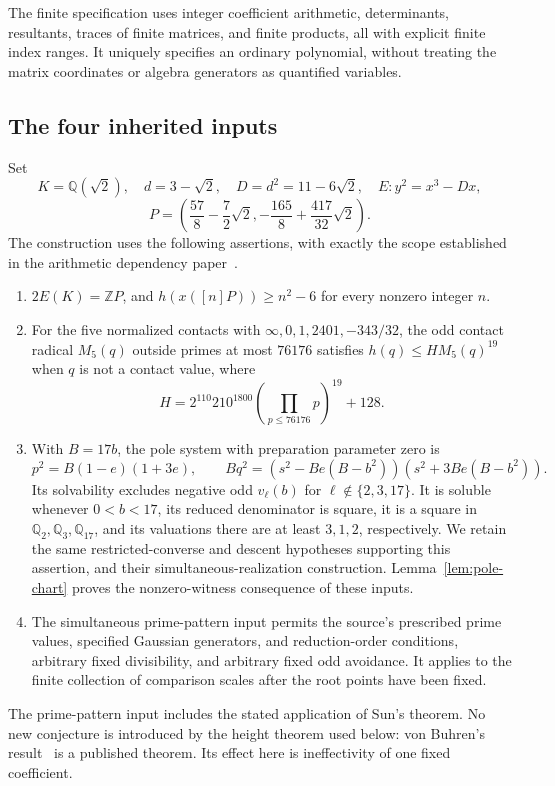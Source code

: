 \documentclass[11pt,a4paper]{article}
\newcommand{\Q}{\mathbb Q}\newcommand{\Z}{\mathbb Z}
\begin{document}
The finite specification uses integer coefficient arithmetic,
determinants, resultants, traces of finite matrices, and finite
products, all with explicit finite index ranges. It uniquely
specifies an ordinary polynomial, without treating the matrix
coordinates or algebra generators as quantified variables.

\subsection{The four inherited inputs}\label{sec:inputs}

Set
\[
 K=\Q(\sqrt2),\quad d=3-\sqrt2,\quad D=d^2=11-6\sqrt2,
 \quad E:y^2=x^3-Dx,
\]
\[
 P=\left(\frac{57}{8}-\frac72\sqrt2,
          -\frac{165}{8}+\frac{417}{32}\sqrt2\right).
\]
The construction uses the following assertions, with exactly the
scope established in the arithmetic dependency paper~\cite{Dependencies}.
\begin{enumerate}
\item $2E(K)=\Z P$, and $h(x([n]P))\ge n^2-6$ for every
      nonzero integer $n$.
\item For the five normalized contacts with
      $\infty,0,1,2401,-343/32$, the odd contact radical
      $M_5(q)$ outside primes at most $76176$ satisfies
      $h(q)\le H M_5(q)^{19}$ when $q$ is not a contact value,
      where
\[
 H=2^{110}210^{1800}\left(\prod_{p\le76176}p\right)^{19}+128.
\]
\item With $B=17b$, the pole system with preparation parameter
      zero is
\[
 p^2=B(1-e)(1+3e),\qquad
 Bq^2=(s^2-Be(B-b^2))(s^2+3Be(B-b^2)).
\]
      Its solvability excludes negative odd $v_\ell(b)$ for
      $\ell\notin\{2,3,17\}$. It is soluble whenever
      $0<b<17$, its reduced denominator is square, it is a
      square in $\Q_2,\Q_3,\Q_{17}$, and its valuations there
      are at least $3,1,2$, respectively. We retain the same
      restricted-converse and descent hypotheses supporting this
      assertion, and their simultaneous-realization construction.
      Lemma~\ref{lem:pole-chart} proves the nonzero-witness
      consequence of these inputs.
\item The simultaneous prime-pattern input permits the source's
      prescribed prime values, specified Gaussian generators, and reduction-order
      conditions, arbitrary fixed divisibility, and arbitrary
      fixed odd avoidance. It applies to the finite collection
      of comparison scales after the root points have been fixed.
\end{enumerate}
The prime-pattern input includes the stated application of Sun's
theorem. No new conjecture is introduced by the height theorem
used below: von Buhren's result~\cite{VonBuhren} is a published
theorem. Its effect here is ineffectivity of one fixed coefficient.
\end{document}
